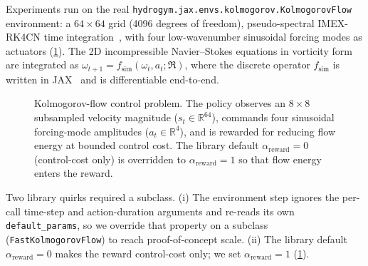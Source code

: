 Experiments run on the real
\texttt{hydrogym.jax.envs.kolmogorov.KolmogorovFlow} environment: a
$64\times 64$ grid (4096 degrees of freedom), pseudo-spectral IMEX-RK4CN
time integration~\cite{hydrogym2026,jaxcfd2021}, with four low-wavenumber
sinusoidal forcing modes as actuators (\cref{fig:env}). The 2D
incompressible Navier--Stokes equations in vorticity form are integrated as
$\omega_{t+1}=f_{\mathrm{sim}}(\omega_t, a_t;\Re)$, where the discrete
operator $f_{\mathrm{sim}}$ is written in JAX~\cite{jax2018} and is differentiable
end-to-end.

\begin{figure}[t]
\centering
{}
\caption{Kolmogorov-flow control problem. The policy observes an $8\times 8$
subsampled velocity magnitude ($s_t\in\mathbb{R}^{64}$), commands four
sinusoidal forcing-mode amplitudes ($a_t\in\mathbb{R}^{4}$), and is rewarded
for reducing flow energy at bounded control cost. The library default
$\alpha_{\text{reward}}=0$ (control-cost only) is overridden to
$\alpha_{\text{reward}}=1$ so that flow energy enters the reward.}
\label{fig:env}
\end{figure}

Two library quirks required a subclass. (i) The environment step ignores the
per-call time-step and action-duration arguments and re-reads its own
\texttt{default\_params}, so we override that property on a subclass
(\texttt{FastKolmogorovFlow}) to reach proof-of-concept scale.
(ii) The library default $\alpha_{\text{reward}}=0$ makes the reward
control-cost only; we set $\alpha_{\text{reward}}=1$ (\cref{fig:env}).


